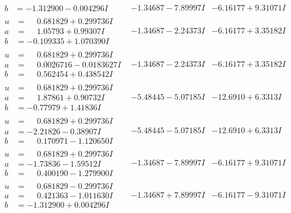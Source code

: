 \documentclass[1p]{elsarticle_modified}
\theoremstyle{definition}
\begin{document}
$$\begin{array}{c|c|c}
\begin{aligned}
b &= -1.312900 - 0.004296 I\end{aligned}
 & -1.34687 - 7.89997 I & -6.16177 + 9.31071 I \\ \hline\begin{aligned}
u &= \phantom{-}0.681829 + 0.299736 I \\
a &= \phantom{-}1.05793 + 0.99307 I \\
b &= -0.109335 + 1.070390 I\end{aligned}
 & -1.34687 - 2.24373 I & -6.16177 + 3.35182 I \\ \hline\begin{aligned}
u &= \phantom{-}0.681829 + 0.299736 I \\
a &= \phantom{-}0.0026716 - 0.0183627 I \\
b &= \phantom{-}0.562454 + 0.438542 I\end{aligned}
 & -1.34687 - 2.24373 I & -6.16177 + 3.35182 I \\ \hline\begin{aligned}
u &= \phantom{-}0.681829 + 0.299736 I \\
a &= \phantom{-}1.87861 + 0.90732 I \\
b &= -0.77979 + 1.41836 I\end{aligned}
 & -5.48445 - 5.07185 I & -12.6910 + 6.3313 I \\ \hline\begin{aligned}
u &= \phantom{-}0.681829 + 0.299736 I \\
a &= -2.21826 - 0.38907 I \\
b &= \phantom{-}0.170971 - 1.120650 I\end{aligned}
 & -5.48445 - 5.07185 I & -12.6910 + 6.3313 I \\ \hline\begin{aligned}
u &= \phantom{-}0.681829 + 0.299736 I \\
a &= -1.73836 - 1.59512 I \\
b &= \phantom{-}0.400190 - 1.279900 I\end{aligned}
 & -1.34687 - 7.89997 I & -6.16177 + 9.31071 I \\ \hline\begin{aligned}
u &= \phantom{-}0.681829 - 0.299736 I \\
a &= \phantom{-}0.421363 - 1.011630 I \\
b &= -1.312900 + 0.004296 I\end{aligned}
 & -1.34687 + 7.89997 I & -6.16177 - 9.31071 I \\ \hline\begin{aligned}

\end{aligned}
\end{array}$$
\end{document}
